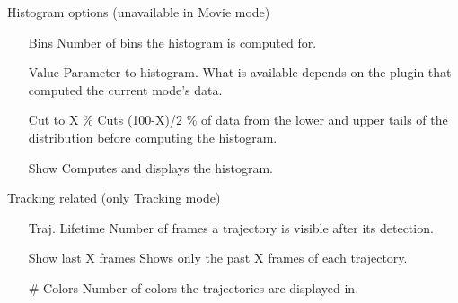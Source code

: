 \documentclass[11pt,onside]{report}
\numberwithin{equation}{chapter}
\begin{document}
\textsf{Histogram options (unavailable in \textsf{Movie} mode)}
\begin{itemize}[leftmargin=3cm]
\item[Bins] Number of bins the histogram is computed for.
\item[Value] Parameter to histogram. What is available depends on the plugin that computed the current mode's data.
\item[Cut to X \%] Cuts (100-X)/2 \% of data from the lower and upper tails of the distribution before computing the histogram. 
\item[Show] Computes and displays the histogram.
\newline
\end{itemize}

\textsf{Tracking related (only \textsf{Tracking} mode)}
\begin{itemize}[leftmargin=3.5cm]
\item[Traj. Lifetime] Number of frames a trajectory is visible after its detection.
\item[Show last X frames] Shows only the past X frames of each trajectory.
\item[\# Colors] Number of colors the trajectories are displayed in. 
\end{itemize}

\clearpage
\end{document}
